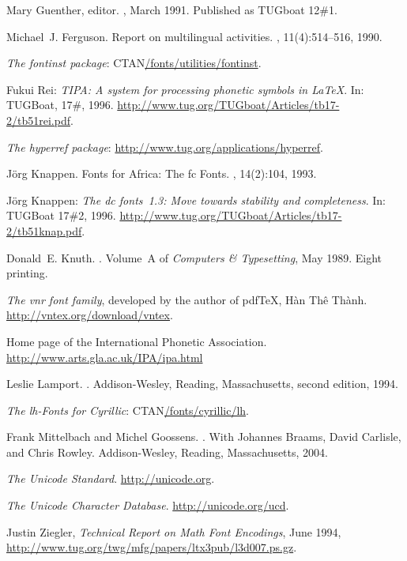 \documentclass{ltxguide}[1994/11/20]
\providecommand{\Pkg}[1]{%
  \textsf{#1}}
\begin{document}
\begin{thebibliography}{99}
Mary Guenther, editor.
, March 1991.
\newblock Published as {TUG}boat 12\#1.

Michael~J. Ferguson.
\newblock Report on multilingual activities.
, 11(4):514--516, 1990.

 \emph{The \Pkg{fontinst} package}:
  \textlangle CTAN\textrangle\url{/fonts/utilities/fontinst}.

 Fukui Rei:
  \emph{\textsl{TIPA}: A system for processing phonetic
      symbols in \LaTeX}.  In: TUGBoat, 17\#, 1996.
  \url{http://www.tug.org/TUGboat/Articles/tb17-2/tb51rei.pdf}.

 \emph{The \Pkg{hyperref} package}:
  \url{http://www.tug.org/applications/hyperref}.

J\"org Knappen.
\newblock Fonts for Africa: The fc Fonts.
, 14(2):104, 1993.

 J\"org Knappen:
  \emph{The \Pkg{dc} fonts~1.3: Move towards stability
      and completeness}.  In: TUGBoat 17\#2, 1996.
  \url{http://www.tug.org/TUGboat/Articles/tb17-2/tb51knap.pdf}.

Donald~E. Knuth.
.
\newblock Volume~A of {\em Computers \& {T}ypesetting\/},
  May 1989.
\newblock Eight printing.

 \emph{The \Pkg{vnr} font family}, developed by
   the author of pdf\TeX, {H\`an Th\^e\protect\llap{\raise 0.5ex\hbox{\'{\relax}}} Th\`anh}.
   \url{http://vntex.org/download/vntex}.

  Home page of the International Phonetic Association.
   \url{http://www.arts.gla.ac.uk/IPA/ipa.html}

Leslie Lamport.
.
\newblock Addison-Wesley, Reading, Massachusetts, second edition, 1994.

 \emph{The \Pkg{lh}-Fonts for Cyrillic}:
  \textlangle CTAN\textrangle\url{/fonts/cyrillic/lh}.

Frank Mittelbach and Michel Goossens.
.
\newblock With Johannes Braams, David Carlisle, and Chris Rowley.
\newblock Addison-Wesley, Reading, Massachusetts, 2004.

 \emph{The Unicode Standard}.
  \url{http://unicode.org}.

 \emph{The Unicode Character Database}.
  \url{http://unicode.org/ucd}.

 Justin Ziegler, \emph{Technical
    Report on Math Font Encodings}, June 1994,
  \url{http://www.tug.org/twg/mfg/papers/ltx3pub/l3d007.ps.gz}.

\end{thebibliography}
\end{document}
